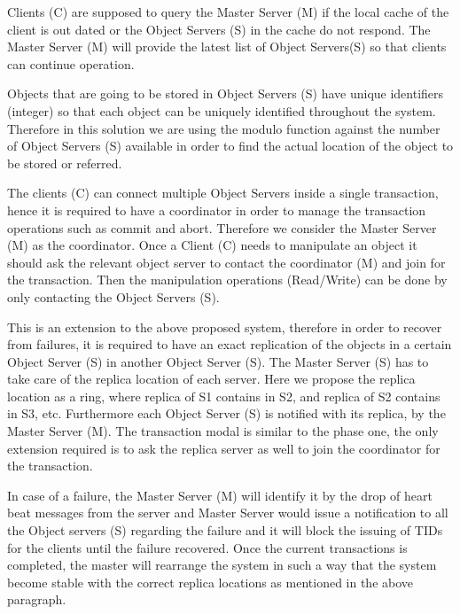 \documentclass[times, 10pt,twocolumn]{article}
\begin{document}
Clients (C) are supposed to query the Master Server (M) if the local cache of the client is out dated or the Object Servers (S) in the cache do not respond. The Master Server (M) will 
provide the latest list of Object Servers(S) so that clients can continue operation.

Objects that are going to be stored in Object Servers (S) have unique identifiers (integer) so that each object can be uniquely identified throughout the system. Therefore in this solution
we are using the modulo function against the number of Object Servers (S) available in order to find the actual location of the object to be stored or referred.

The clients (C) can connect multiple Object Servers inside a single transaction, hence it is required to have a coordinator in order to manage the transaction operations such as commit and abort.
Therefore we consider the Master Server (M) as the coordinator. Once a Client (C) needs to manipulate an object it should ask the relevant object server to contact the coordinator (M) and join 
for the transaction. Then the manipulation operations (Read/Write) can be done by only contacting the Object Servers (S).

\label{subsec:phase2}
This is an extension to the above proposed system, therefore in order to recover from failures, it is required to have an exact replication of the objects in a certain Object Server (S) in 
another Object Server (S). The Master Server (S) has to take care of the replica location of each server. Here we propose the replica location as a ring, where replica of S1 contains in S2, 
and replica of S2 contains in S3, etc. Furthermore each Object Server (S) is notified with its replica, by the Master Server (M). The transaction modal is similar to the phase one, the
only extension required is to ask the replica server as well to join the coordinator for the transaction.

In case of a failure, the Master Server (M) will identify it by the drop of heart beat messages from the server and Master Server would issue a notification to all the Object servers (S) 
regarding the failure and it will block the issuing of TIDs for the clients until the failure recovered. Once the current transactions is completed, the master will rearrange the system in
such a way that the system become stable with the correct replica locations as mentioned in the above paragraph.
\end{document}

